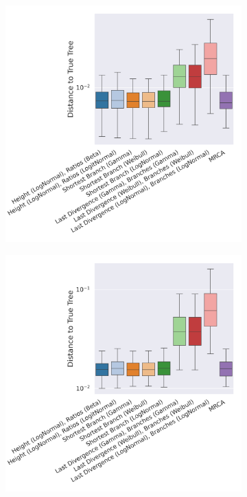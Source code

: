 \documentclass[10pt,letterpaper]{article}
\begin{document}
\begin{figure}
	\caption{The log squared branch distance to the true tree for point estimates using the different distributions and datasets. (The lower the better.)}
	
	\centering
	\begin{subfigure}[b]{0.45\textwidth}
		\centering
		\includegraphics[width=\textwidth]{figures/yule-100-ccd1-point-estimates.png}
	\end{subfigure}
	\begin{subfigure}[b]{0.45\textwidth}
		\centering
		\includegraphics[width=\textwidth]{figures/yule-200-ccd1-point-estimates.png}
	\end{subfigure}
	

\end{figure}
\end{document}
